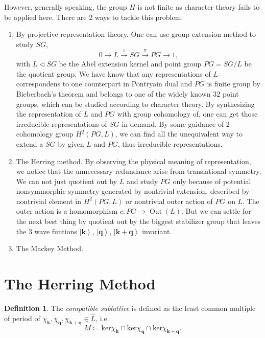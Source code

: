 \documentclass[11pt, reqno]{amsart}
\theoremstyle{definition}
\newtheorem{definition}[theorem]{Definition}
\theoremstyle{remark}
\begin{document}
However, generally speaking, the group $H$ is not finite as character theory fails to be applied here. There are 2 ways to tackle this problem:
\begin{enumerate}
    \item By projective representation theory. One can use group extension method to study $SG$,
    \begin{equation}
        0\rightarrow L\xrightarrow{\iota}SG\xrightarrow{\pi}PG\rightarrow 1,
    \end{equation}
    with $L\lhd SG$ be the Abel extension kernel and point group $PG=SG/L$ be the quotient group. We have know that any representations of $L$ correspondens to one counterpart in Pontryain dual and $PG$ is finite group by Bieberbach's theorem and belongs to one of the widely known 32 point groups, which can be studied according to character theory. By synthesizing the representation of $L$ and $PG$ with group cohomology of, one can get those irreducible representations of $SG$ in demand. By some guidance of 2-cohomology group $H^2\left( PG,L \right)$, we can find all the unequivalent way to extend a $SG$ by given $L$ and $PG$, thus irreducible representations.
    \item The Herring method. By observing the physical meaning of representation, we notice that the unnecessary redundance arise from translational symmetry. We can not just quotient out by $L$ and study $PG$ only because of potential nonsymmorphic symmetry generated by nontrivial extension, described by nontrivial element in $H^2\left( PG,L \right)$ or nontrivial outer action of $PG$ on $L$. The outer action is a homomorphism $c:PG\rightarrow \operatorname{Out}\left( L \right)$. But we can settle for the next best thing by quotient out by the biggest stabilizer group that leaves the 3 wave funtions $\left| \mathbf{k} \right>$, $\left| \mathbf{q} \right>$, $\left| \mathbf{k}+\mathbf{q} \right>$ invariant.
    \item The Mackey Method.
\end{enumerate}



\section{The Herring Method}

\begin{definition}\label{def: M}
    The \textit{compatible sublattice} is defined as the least common multiple of period of $\chi _{\mathbf{k}},\chi _{\mathbf{q}},\chi _{\mathbf{k}+\mathbf{q}}\in \hat{L}$, i.e.
    \begin{equation}
        M\coloneqq \mathrm{ker}\chi _{\mathbf{k}}\cap \mathrm{ker}\chi _{\mathbf{q}}\cap \mathrm{ker}\chi _{\mathbf{k}+\mathbf{q}}.
    \end{equation}
\end{definition}
\end{document}
